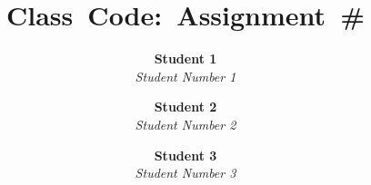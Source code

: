 \newcommand{\hmwkTitle}{Assignment\ \#} %
\newcommand{\hmwkClass}{Class\ Code} %
\newcommand{\hmwkDueDate}{Due\ Date} %

\date{}

\title{
    \vspace{2in}
    \textmd{\textbf{\hmwkClass:\ \hmwkTitle}}\\
    \vspace{3.in}
}

\newcommand{\hmwkAuthorNameOne}{Student 1}
\newcommand{\hmwkAuthorNumberOne}{Student Number 1}
\newcommand{\hmwkAuthorNameTwo}{Student 2}
\newcommand{\hmwkAuthorNumberTwo}{Student Number 2}
\newcommand{\hmwkAuthorNameThree}{Student 3}
\newcommand{\hmwkAuthorNumberThree}{Student Number 3}

\author{
    \textbf{\hmwkAuthorNameOne}\\
    \textit{\hmwkAuthorNumberOne}
    \and
    \textbf{\hmwkAuthorNameTwo}\\
    \textit{\hmwkAuthorNumberTwo}
    \and
    \textbf{\hmwkAuthorNameThree}\\
    \textit{\hmwkAuthorNumberThree}
}
